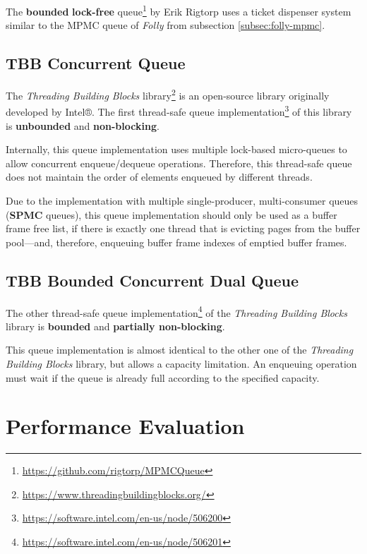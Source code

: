 	The \textbf{bounded} \textbf{lock-free} queue\footnote{\url{https://github.com/rigtorp/MPMCQueue}} by Erik Rigtorp uses a ticket dispenser system similar to the MPMC queue of \textit{Folly} from subsection \ref{subsec:folly-mpmc}.

\subsection[TBB Concurrent Queue]{TBB Concurrent Queue} \label{subsec:intel-unbounded}

	The \textit{Threading Building Blocks} library\footnote{\url{https://www.threadingbuildingblocks.org/}} is an open-source library originally developed by Intel®. The first thread-safe queue implementation\footnote{\url{https://software.intel.com/en-us/node/506200}} of this library is \textbf{unbounded} and \textbf{non-blocking}.
	
	Internally, this queue implementation uses multiple lock-based micro-queues to allow concurrent enqueue/dequeue operations. Therefore, this thread-safe queue does not maintain the order of elements enqueued by different threads.

    Due to the implementation with multiple single-producer, multi-consumer queues (\textbf{SPMC} queues), this queue implementation should only be used as a buffer frame free list, if there is exactly one thread that is evicting pages from the buffer pool---and, therefore, enqueuing buffer frame indexes of emptied buffer frames.

\subsection[TBB Bounded Concurrent Queue]{TBB Bounded Concurrent Dual Queue} \label{subsec:intel-bounded}

	The other thread-safe queue implementation\footnote{\url{https://software.intel.com/en-us/node/506201}} of the \textit{Threading Building Blocks} library is \textbf{bounded} and \textbf{partially non-blocking}.
	
	This queue implementation is almost identical to the other one of the \textit{Threading Building Blocks} library, but allows a capacity limitation. An enqueuing operation must wait if the queue is already full according to the specified capacity.

\section[Performance Evaluation]{Performance Evaluation} \label{sec:free-list-performance}

